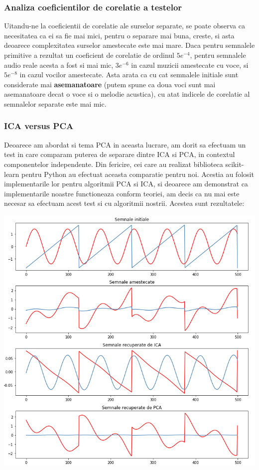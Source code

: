 \documentclass[12pt,oneside]{article}
\begin{document}
\subsubsection{Analiza coeficientilor de corelatie a testelor}
Uitandu-ne la coeficientii de corelatie ale surselor separate, se poate observa ca necesitatea ca ei sa fie mai mici, pentru o separare mai buna, creste, si asta deoarece complexitatea surselor amestecate este mai mare. Daca pentru semnalele primitive a rezultat un coeficient de corelatie de ordinul $5e^{-4}$, pentru semnalele audio reale acesta a fost si mai mic, $3e^{-6}$ in cazul muzicii amestecate cu voce, si $5e^{-8}$ in cazul vocilor amestecate. Asta arata ca cu cat semnalele initiale sunt considerate mai \textbf{asemanatoare} (putem spune ca doua voci sunt mai asemanatoare decat o voce si o melodie acustica), cu atat indicele de corelatie al semnalelor separate este mai mic.

\subsubsection{ICA versus PCA}
Deoarece am abordat si tema PCA in aceasta lucrare, am dorit sa efectuam un test in care comparam puterea de separare dintre ICA si PCA, in contextul componentelor independente. Din fericire, cei care au realizat biblioteca scikit-learn pentru Python au efectuat aceasta comparatie pentru noi.\cite{scikit_ica_pca} Acestia au folosit implementarile lor pentru algoritmii PCA si ICA, si deoarece am demonstrat ca implementarile noastre functioneaza conform teoriei, am decis ca nu mai este necesar sa efectuam acest test si cu algoritmii nostrii. Acestea sunt rezultatele:
\begin{center}
	\includegraphics[width=\linewidth]{pca_vs_ica}
 \end{center}
\end{document}

